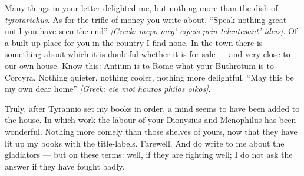 

 Many things in your letter delighted me, but nothing more than the dish of \textit{tyrotarichus}. As for the trifle of money you write about, ``Speak nothing great until you have seen the end'' \textit{[Greek: m\=ep\=o meg' eip\=eis prin teleut\=esant' id\=eis]}. Of a built-up place for you in the country I find none. In the town there is something about which it is doubtful whether it is for sale --- and very close to our own house. Know this: Antium is to Rome what your Buthrotum is to Corcyra. Nothing quieter, nothing cooler, nothing more delightful. ``May this be my own dear home'' \textit{[Greek: ei\=e moi houtos philos oikos]}.

 Truly, after Tyrannio set my books in order, a mind seems to have been added to the house. In which work the labour of your Dionysius and Menophilus has been wonderful. Nothing more comely than those shelves of yours, now that they have lit up my books with the title-labels. Farewell. And do write to me about the gladiators --- but on these terms: well, if they are fighting well; I do not ask the answer if they have fought badly.
